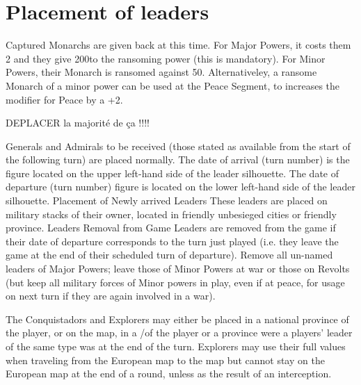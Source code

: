 


\section{Placement of leaders}

Captured Monarchs are given back at this time.
\bparag For Major Powers, it costs them 2 \STAB and they give 200\ducats to
the ransoming power (this is mandatory).
\bparag For Minor Powers, their Monarch is ransomed against 50\ducats.
\bparag Alternativeley, a ransome Monarch of a minor power can be used at the
Peace Segment, to increases the modifier for Peace by a +2.

\begin{todo}
  DEPLACER la majorité de ça !!!!
\end{todo}
\aparag Generals and Admirals to be received (those stated as available from
the start of the following turn) are placed normally.
The date of arrival (turn number) is the figure located on the upper left-hand
side of the leader silhouette.  The date of departure (turn number) figure is
located on the lower left-hand side of the leader silhouette.
\bparag Placement of Newly arrived Leaders These leaders are placed on
military stacks of their owner, located in friendly unbesieged cities or
friendly province.
\bparag Leaders Removal from Game Leaders are removed from the game if their
date of departure corresponds to the turn just played (i.e. they leave the
game at the end of their scheduled turn of departure).
\bparag Remove all un-named leaders of Major Powers; leave those of Minor
Powers at war or those on Revolts (but keep all military forces of Minor
powers in play, even if at peace, for usage on next turn if they are again
involved in a war).

The Conquistadors and Explorers may either be placed in a national province of
the player, or on the \ROTW map, in a \COL/\TP of the player or a province
were a players' leader of the same type was at the end of the turn.
\bparag Explorers may use their full values when traveling from the European
map to the \ROTW map but cannot stay on the European map at the end of a
round, unless as the result of an interception.

